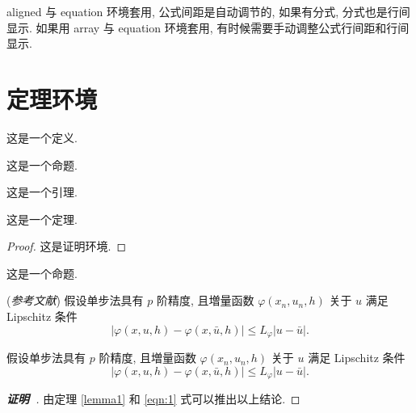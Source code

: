 \documentclass[master]{shnuthesis}
\begin{document}
aligned 与 equation 环境套用, 公式间距是自动调节的, 如果有分式, 分式也是行间显示. 如果用 array 与 equation 环境套用, 有时候需要手动调整公式行间距和行间显示.



\section{定理环境}

\begin{definition}
这是一个定义.
\end{definition}

\begin{proposition}
这是一个命题.
\end{proposition}

\begin{lemma}[Lemma]\label{lemma1}
这是一个引理.
\end{lemma}

\begin{theorem}[Theorem]
这是一个定理.
\end{theorem}
\begin{proof}
这是证明环境.
\end{proof}

\begin{proposition}[Proposition]
这是一个命题.
\end{proposition}

\begin{lemma}\label{lemma-convergence} {\rm (\textit{参考文献}\cite{LiLiu1997})}
假设单步法具有 $p$ 阶精度, 且増量函数 $\varphi(x_{n}, u_{n}, h)$ 关于 $u$ 满足 {\rm Lipschitz} 条件
\begin{equation}\label{eqn:3}
|\varphi(x, u, h)-\varphi(x, \bar{u}, h)| \leqslant L_{\varphi}|u-\bar{u}|.
\end{equation}
\end{lemma}

\begin{theorem}\label{theorem-convergence}
假设单步法具有 $p$ 阶精度, 且増量函数 $\varphi(x_{n}, u_{n}, h)$ 关于 $u$ 满足 {\rm Lipschitz} 条件
\begin{equation}\label{eqn:4}
|\varphi(x, u, h)-\varphi(x, \bar{u}, h)| \leqslant L_{\varphi}|u-\bar{u}|.
\end{equation}
\end{theorem}
\begin{proof}[\normalfont\bfseries 证明~\nopunct]
由定理 \ref{lemma1} 和 \eqref{eqn:1} 式可以推出以上结论.
\end{proof}
\end{document}
